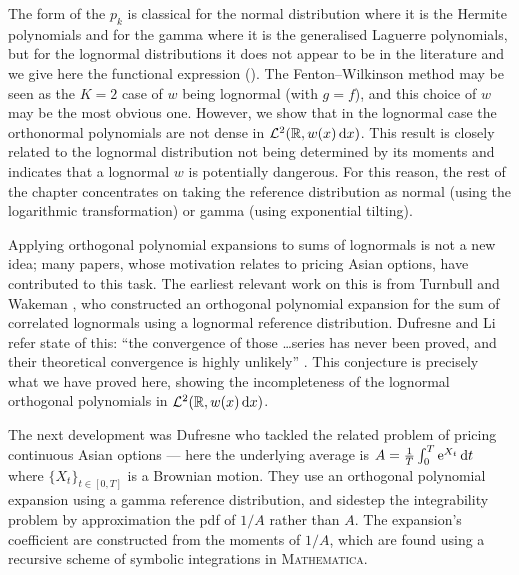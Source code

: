 The form of the $p_k$ is classical for the normal distribution where it is the Hermite polynomials and for the gamma where  it is the generalised Laguerre polynomials,
but for the lognormal distributions it does not appear to be in the literature and we give here  the functional expression
(). The Fenton--Wilkinson method may be seen
as the $K=2$ case of $w$ being lognormal (with $g=f$), and this choice of $w$  may be the most obvious one.
However, we show that in the lognormal case the orthonormal polynomials are not dense in $\mathcal{L}^2(\mathbb{R}, w(x) \mathop{}\!\mathrm{d} x)$. This result is closely related
to the lognormal distribution not being determined by its moments
\cite{Heyde63,Berg1984} and indicates that a lognormal $w$ is potentially dangerous.
For this reason, the rest of the chapter concentrates on  taking the reference distribution as normal (using the logarithmic transformation)
or gamma  (using exponential tilting).

Applying orthogonal polynomial expansions to sums of lognormals is not a new idea; many papers, whose motivation relates to pricing Asian options, have contributed to this task. The earliest relevant work on this is from Turnbull and Wakeman \cite{turnbull1991quick}, who constructed an orthogonal polynomial expansion for the sum of correlated lognormals using a lognormal reference distribution. Dufresne and Li refer state of this: ``the convergence of those \dots series has never been proved, and their theoretical convergence is highly unlikely'' \cite[p.\ 1]{dufresne2016pricing}. This conjecture is precisely what we have proved here, showing the incompleteness of the lognormal orthogonal polynomials in $\mathcal{L}^2(\mathbb{R}, w(x) \mathop{}\!\mathrm{d} x)$.

The next development was Dufresne \cite{dufresne2000laguerre} who tackled the related problem of pricing continuous Asian options --- here the underlying average is $A = \frac1T \int_0^T \mathrm{e}^{X_t} \mathop{}\!\mathrm{d} t$ where $\{X_t\}_{t\in[0,T]}$ is a Brownian motion. They use an orthogonal polynomial expansion using a gamma reference distribution, and sidestep the integrability problem by approximation the pdf of $1/A$ rather than $A$. The expansion's coefficient are constructed from the moments of $1/A$, which are found using a recursive scheme of symbolic integrations in \textsc{Mathematica}.

